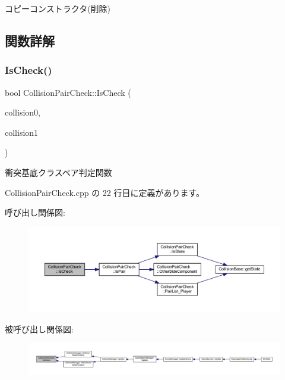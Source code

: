 コピーコンストラクタ(削除) 



\subsection{関数詳解}
\mbox{\label{class_collision_pair_check_aa7603c32ae782ad890280d360ae19dfe}} 
\subsubsection{\texorpdfstring{Is\+Check()}{IsCheck()}}
{\footnotesize\ttfamily bool Collision\+Pair\+Check\+::\+Is\+Check (\begin{DoxyParamCaption}\item[{\mbox{\hyperlink{class_collision_base}{Collision\+Base}} $\ast$}]{collision0,  }\item[{\mbox{\hyperlink{class_collision_base}{Collision\+Base}} $\ast$}]{collision1 }\end{DoxyParamCaption})\hspace{0.3cm}{\ttfamily [static]}}



衝突基底クラスペア判定関数 



 Collision\+Pair\+Check.\+cpp の 22 行目に定義があります。

呼び出し関係図\+:\nopagebreak
\begin{figure}[H]
\begin{center}
\leavevmode
\includegraphics[width=350pt]{class_collision_pair_check_aa7603c32ae782ad890280d360ae19dfe_cgraph}
\end{center}
\end{figure}
被呼び出し関係図\+:
\nopagebreak
\begin{figure}[H]
\begin{center}
\leavevmode
\includegraphics[width=350pt]{class_collision_pair_check_aa7603c32ae782ad890280d360ae19dfe_icgraph}
\end{center}
\end{figure}
\mbox{\label{class_collision_pair_check_a52eefe9e5b104075d4c812ca9b68ff16}} 
